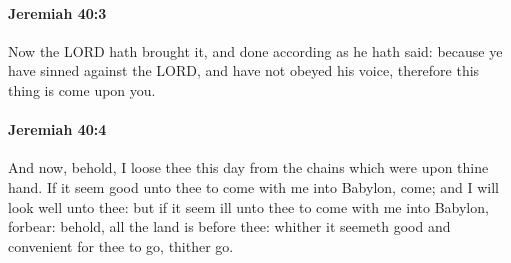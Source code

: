 		\paragraph{Jeremiah 40:3} %
			\label{JEREMIAH-40-3}

			Now the LORD hath brought it, and done according as he hath said: because ye have sinned against the LORD, and have not obeyed his voice, therefore this thing is come upon you.


		\paragraph{Jeremiah 40:4} %
			\label{JEREMIAH-40-4}

			And now, behold, I loose thee this day from the chains which were upon thine hand. If it seem good unto thee to come with me into Babylon, come; and I will look well unto thee: but if it seem ill unto thee to come with me into Babylon, forbear: behold, all the land is before thee: whither it seemeth good and convenient for thee to go, thither go.

